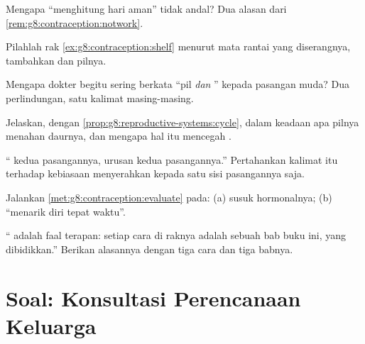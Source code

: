 \begin{exercise}[$\star$]\label{exo:g8:contraception:6}
Mengapa ``menghitung hari aman'' tidak andal? Dua alasan
dari \cref{rem:g8:contraception:notwork}.
\end{exercise}

\begin{exercise}[$\star\star$]\label{exo:g8:contraception:7}
Pilahlah rak \cref{ex:g8:contraception:shelf} menurut mata
rantai yang diserangnya, tambahkan  dan pilnya.
\end{exercise}

\begin{exercise}[$\star\star$]\label{exo:g8:contraception:8}
Mengapa dokter begitu sering berkata ``pil \emph{dan}
'' kepada pasangan muda? Dua perlindungan, satu
kalimat masing-masing.
\end{exercise}

\begin{exercise}[$\star\star$]\label{exo:g8:contraception:9}
Jelaskan, dengan
\cref{prop:g8:reproductive-systems:cycle}, dalam keadaan apa
pilnya menahan daurnya, dan mengapa hal itu mencegah
.
\end{exercise}

\begin{exercise}[$\star\star$]\label{exo:g8:contraception:10}
`` kedua pasangannya, urusan kedua pasangannya.''
Pertahankan kalimat itu terhadap kebiasaan menyerahkan
 kepada satu sisi pasangannya saja.
\end{exercise}

\begin{exercise}[$\star\star$]\label{exo:g8:contraception:11}
Jalankan \cref{met:g8:contraception:evaluate} pada: (a)
susuk hormonalnya; (b) ``menarik diri tepat waktu''.
\end{exercise}

\begin{exercise}[$\star\star\star$]\label{exo:g8:contraception:12}
`` adalah faal terapan: setiap cara di raknya
adalah sebuah bab buku ini, yang dibidikkan.'' Berikan
alasannya dengan tiga cara dan tiga babnya.
\end{exercise}

\section{Soal: Konsultasi Perencanaan Keluarga}

